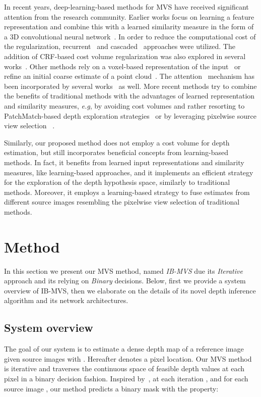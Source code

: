 \documentclass{bmvc2k}
\def\eg{\emph{e.g}\bmvaOneDot}
\begin{document}
In recent years, deep-learning-based methods for MVS have received significant attention from the research community.
Earlier works focus on learning a feature representation and combine this with a learned similarity measure in the form of a 3D convolutional neural network~\cite{deepmvs,mvsnet}.
In order to reduce the computational cost of the regularization, recurrent~\cite{rmvsnet, dhcrmvsnet} and cascaded~\cite{casmvs, ucsnet} approaches were utilized.
The addition of CRF-based cost volume regularization was also explored in several works~\cite{bp_mvsnet,mvscrf}.
Other methods rely on a voxel-based representation of the input~\cite{surfacenet, surfacenet_plus} or refine an initial coarse estimate of a point cloud~\cite{pointmvsnet}.
The attention~\cite{attention_neurips} mechanism has been incorporated by several works~\cite{attmvsnet, lanet} as well.
More recent methods try to combine the benefits of traditional methods with the advantages of learned representation and similarity measures, \eg, by avoiding cost volumes and rather resorting to PatchMatch-based depth exploration strategies~\cite{patchmatchnet} or by leveraging pixelwise source view selection ~\cite{vismvsnet}. 

Similarly, our proposed method does not employ a cost volume for depth estimation, but still incorporates beneficial concepts from learning-based methods. 
In fact, it benefits from learned input representations and similarity measures, like learning-based approaches, and it implements an efficient strategy for the exploration of the depth hypothesis space, similarly to traditional methods.
Moreover, it employs a learning-based strategy to fuse estimates from different source images resembling the pixelwise view selection of traditional methods.
\vspace{-1em}
\section{Method} \label{sec_method}
In this section we present our MVS method, named \textit{IB-MVS} due its \textit{Iterative} approach and its relying on \textit{Binary} decisions.
Below, first we provide a system overview of IB-MVS, then we elaborate on the details of its novel depth inference algorithm and its network architectures.
\subsection{System overview}
The goal of our system is to estimate a dense depth map  of a reference image  given  source images  with .
Hereafter  denotes a pixel location.
Our MVS method is iterative and traverses the continuous space of feasible depth values at each pixel in a binary decision fashion.
Inspired by~\cite{bi3d_stereo}, at each iteration , and for each source image , our method predicts a binary mask with the property:
 
\end{document}
